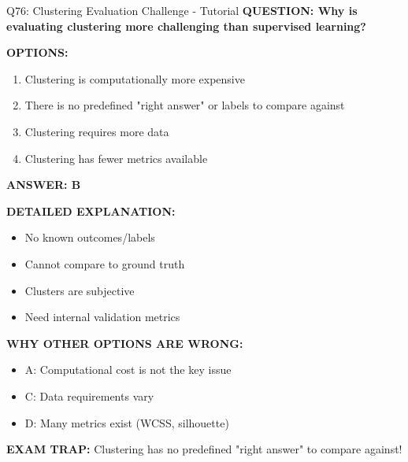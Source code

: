 \documentclass[8pt]{beamer}
\begin{document}
	\begin{frame}{Q76: Clustering Evaluation Challenge - Tutorial}
		\fontsize{6.5}{7.5}\selectfont
		\textbf{QUESTION: Why is evaluating clustering more challenging than supervised learning?}
		
		\vspace{0.1cm}
		\textbf{OPTIONS:}
		\begin{enumerate}
			\item Clustering is computationally more expensive
			\item There is no predefined "right answer" or labels to compare against
			\item Clustering requires more data
			\item Clustering has fewer metrics available
		\end{enumerate}
		
		\vspace{0.1cm}
		\textcolor{myblue}{\textbf{ANSWER: B}}
		
		\vspace{0.1cm}
		\textbf{DETAILED EXPLANATION:}
		\begin{itemize}
			\item No known outcomes/labels
			\item Cannot compare to ground truth
			\item Clusters are subjective
			\item Need internal validation metrics
		\end{itemize}
		
		\vspace{0.1cm}
		\textcolor{myred}{\textbf{WHY OTHER OPTIONS ARE WRONG:}}
		\begin{itemize}
			\item \textcolor{myred}{A:} Computational cost is not the key issue
			\item \textcolor{myred}{C:} Data requirements vary
			\item \textcolor{myred}{D:} Many metrics exist (WCSS, silhouette)
		\end{itemize}
		
		\textcolor{myred}{\textbf{EXAM TRAP:}} Clustering has \textcolor{myblue}{no predefined "right answer"} to compare against!
	\end{frame}
	
\end{document}

